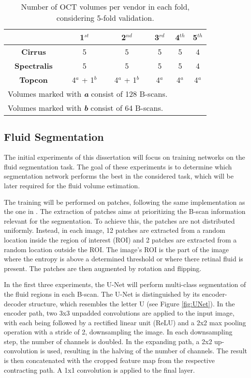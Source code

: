 \begin{table*}[!ht]
	\setlength{\tabcolsep}{6pt}
	\renewcommand{\arraystretch}{1.3}
	\caption{Number of OCT volumes per vendor in each fold, considering 5-fold validation.}
	\centering
	\begin{tabular}{|c|c|c|c|c|c|}
		\hline
		& \textbf{1$^{st}$} & \textbf{2$^{nd}$} & \textbf{3$^{rd}$} & \textbf{4$^{th}$} & \textbf{5$^{th}$} \\
		\hline
		\textbf{Cirrus} & 5 & 5 & 5 & 5 & 4 \\
		\textbf{Spectralis} & 5 & 5 & 5 & 5 & 4 \\
		\textbf{Topcon} & 4$^{a}$ + 1$^{b}$ & 4$^{a}$ + 1$^{b}$ & 4$^{a}$ & 4$^{a}$ & 4$^{a}$ \\
		\hline
		\multicolumn{4}{l}{Volumes marked with \textbf{\textit{a}} consist of 128 B-scans.} \\
		\multicolumn{4}{l}{Volumes marked with \textbf{\textit{b}} consist of 64 B-scans.}
	\end{tabular}
	\label{tab:FiveFoldSplit}
\end{table*}

\subsection{Fluid Segmentation}
The initial experiments of this dissertation will focus on training networks on the fluid segmentation task. The goal of these experiments is to determine which segmentation network performs the best in the considered task, which will be later required for the fluid volume estimation.
\par
The training will be performed on patches, following the same implementation as the one in \textcite{Tennakoon2018}. The extraction of patches aims at prioritizing the B-scan information relevant for the segmentation. To achieve this, the patches are not distributed uniformly. Instead, in each image, 12 patches are extracted from a random location inside the region of interest (ROI) and 2 patches are extracted from a random location outside the ROI. The image's ROI is the part of the image where the entropy is above a determined threshold or where there retinal fluid is present. The patches are then augmented by rotation and flipping.
\par
In the first three experiments, the U-Net \parencite{Ronneberger2015} will perform multi-class segmentation of the fluid regions in each B-scan. The U-Net is distinguished by its encoder-decoder structure, which resembles the letter U (see Figure \ref{fig:UNet}). In the encoder path, two 3x3 unpadded convolutions are applied to the input image, with each being followed by a rectified linear unit (ReLU) and a 2x2 max pooling operation with a stride of 2, downsampling the image. In each downsampling step, the number of channels is doubled. In the expanding path, a 2x2 up-convolution is used, resulting in the halving of the number of channels. The result is then concatenated with the cropped feature map from the respective contracting path. A 1x1 convolution is applied to the final layer.

